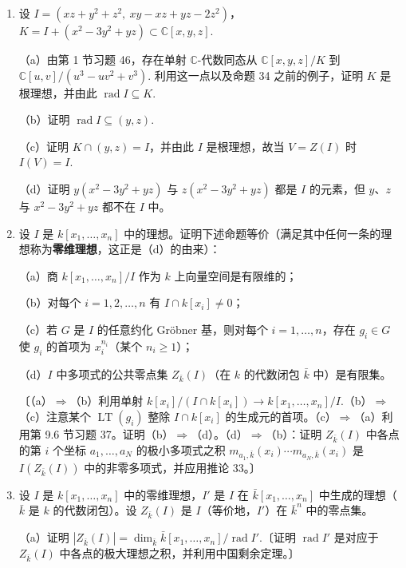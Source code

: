 \begin{enumerate}
\item 设 \(I = (xz+y^2+z^2,\ xy-xz+yz-2z^2)\)，\(K = I+(x^2-3y^2+yz) \subset \mathbb{C}[x,y,z]\).

（a）由第 1 节习题 46，存在单射 \(\mathbb{C}\)-代数同态从 \(\mathbb{C}[x,y,z]/K\) 到 \(\mathbb{C}[u,v]/(u^3-uv^2+v^3)\). 利用这一点以及命题 34 之前的例子，证明 \(K\) 是根理想，并由此 \(\operatorname{rad}I \subseteq K\).

（b）证明 \(\operatorname{rad}I \subseteq (y,z)\).

（c）证明 \(K \cap (y,z) = I\)，并由此 \(I\) 是根理想，故当 \(V = Z(I)\) 时 \(I(V) = I\).

（d）证明 \(y(x^2-3y^2+yz)\) 与 \(z(x^2-3y^2+yz)\) 都是 \(I\) 的元素，但 \(y\)、\(z\) 与 \(x^2-3y^2+yz\) 都不在 \(I\) 中。

\item 设 \(I\) 是 \(k[x_1, \ldots, x_n]\) 中的理想。证明下述命题等价（满足其中任何一条的理想称为\textbf{零维理想}，这正是（d）的由来）：

（a）商 \(k[x_1, \ldots, x_n]/I\) 作为 \(k\) 上向量空间是有限维的；

（b）对每个 \(i = 1, 2, \ldots, n\) 有 \(I \cap k[x_i] \neq 0\)；

（c）若 \(G\) 是 \(I\) 的任意约化 Gröbner 基，则对每个 \(i = 1, \ldots, n\)，存在 \(g_i \in G\) 使 \(g_i\) 的首项为 \(x_i^{n_i}\)（某个 \(n_i \geq 1\)）；

（d）\(I\) 中多项式的公共零点集 \(Z_{\bar k}(I)\)（在 \(k\) 的代数闭包 \(\bar k\) 中）是有限集。

〔（a）\(\Rightarrow\)（b）利用单射 \(k[x_i]/(I \cap k[x_i]) \to k[x_1, \ldots, x_n]/I\).（b）\(\Rightarrow\)（c）注意某个 \(\operatorname{LT}(g_i)\) 整除 \(I \cap k[x_i]\) 的生成元的首项。（c）\(\Rightarrow\)（a）利用第 9.6 节习题 37。证明（b）\(\Rightarrow\)（d）。（d）\(\Rightarrow\)（b）：证明 \(Z_{\bar k}(I)\) 中各点的第 \(i\) 个坐标 \(a_1, \ldots, a_N\) 的极小多项式之积 \(m_{a_1,\bar k}(x_i)\cdots m_{a_N,\bar k}(x_i)\) 是 \(I(Z_{\bar k}(I))\) 中的非零多项式，并应用推论 33。〕

\item 设 \(I\) 是 \(k[x_1, \ldots, x_n]\) 中的零维理想，\(I'\) 是 \(I\) 在 \(\bar k[x_1, \ldots, x_n]\) 中生成的理想（\(\bar k\) 是 \(k\) 的代数闭包）。设 \(Z_{\bar k}(I)\) 是 \(I\)（等价地，\(I'\)）在 \(\bar k^n\) 中的零点集。

（a）证明 \(|Z_{\bar k}(I)| = \dim_{\bar k}\bar k[x_1, \ldots, x_n]/\operatorname{rad}I'\).〔证明 \(\operatorname{rad}I'\) 是对应于 \(Z_{\bar k}(I)\) 中各点的极大理想之积，并利用中国剩余定理。〕


\end{enumerate}
